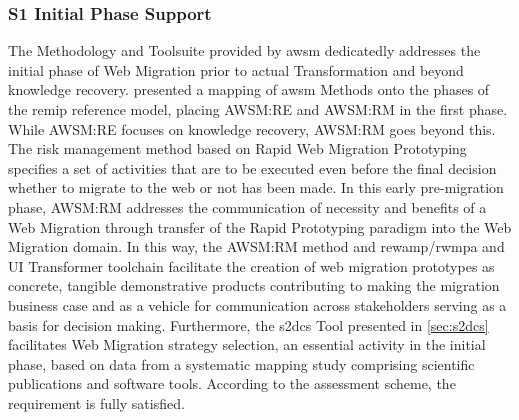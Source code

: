 \subsubsection*{S1 Initial Phase Support}
The Methodology and Toolsuite provided by \gls{awsm} dedicatedly addresses the initial phase of \gls{Web Migration} prior to actual \gls{Transformation} and beyond knowledge recovery.
 presented a mapping of \gls{awsm} Methods onto the phases of the \gls{remip} reference model, placing AWSM:RE and AWSM:RM in the first phase.
While AWSM:RE focuses on knowledge recovery, AWSM:RM goes beyond this.
The \gls{risk management} method based on \gls{Rapid Web Migration Prototyping} specifies a set of activities that are to be executed even before the final decision whether to migrate to the \gls{web} or not has been made.
In this early pre-migration phase, AWSM:RM addresses the communication of necessity and benefits of a \gls{Web Migration} through transfer of the \gls{Rapid Prototyping} paradigm into the \gls{Web Migration} domain.
In this way, the AWSM:RM method and \gls{rewamp}/\gls{rwmpa} and UI Transformer toolchain facilitate the creation of \glspl{web migration prototype} as concrete, tangible demonstrative products contributing to making the migration \gls{business case} and as a vehicle for communication across stakeholders serving as a basis for decision making.
Furthermore, the \gls{s2dcs} Tool presented in \cref{sec:s2dcs} facilitates \gls{Web Migration} strategy selection, an essential activity in the initial phase, based on data from a systematic mapping study comprising scientific publications and software tools.
According to the assessment scheme, the requirement is fully satisfied.

\vspace{-10pt}

